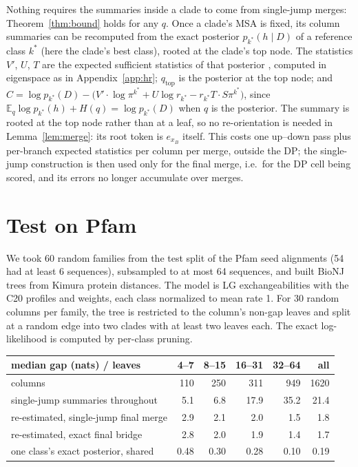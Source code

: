 \documentclass[11pt]{article}
\newcommand{\E}{\mathbb E}
\begin{document}
Nothing requires the summaries inside a clade to come from single-jump merges:
Theorem~\ref{thm:bound} holds for any $q$. Once a clade's MSA is fixed, its
column summaries can be recomputed from the exact posterior $p_{k^*}(h\mid D)$
of a reference class $k^*$ (here the clade's best class), rooted at the clade's
top node. The statistics $V'$, $U$, $T$ are the expected sufficient statistics
of that posterior \citep{HolmesRubin2002,HobolthJensen2005}, computed in
eigenspace as in Appendix~\ref{app:hr}; $q_{\mathrm{top}}$
is the posterior at the top node; and $C=\log p_{k^*}(D)-\big(V'\cdot\log
\pi^{k^*}+U\log r_{k^*}-r_{k^*}T\cdot S\pi^{k^*}\big)$, since
$\E_q\log p_{k^*}(h)+H(q)=\log p_{k^*}(D)$ when $q$ is the posterior. The
summary is rooted at the top node rather than at a leaf, so no re-orientation
is needed in Lemma~\ref{lem:merge}: its root token is $e_{x_B}$ itself. This
costs one up--down pass plus per-branch expected statistics per column per
merge, outside the DP; the single-jump construction is then used only for the
final merge, i.e.\ for the DP cell being scored, and its errors no longer
accumulate over merges.

\section{Test on Pfam}
\label{sec:pfam}

We took 60 random families from the
test split of the Pfam seed alignments (54 had at least 6 sequences),
subsampled to at most 64 sequences, and built BioNJ trees \citep{Gascuel1997}
from Kimura protein
distances. The model is LG exchangeabilities with the C20 profiles and
weights, each class normalized to mean rate 1. For 30 random columns per
family, the tree is restricted to the column's non-gap leaves and split at a
random edge into two clades with at least two leaves each. The exact
log-likelihood is computed by per-class pruning.

\begin{center}
\begin{tabular}{lrrrrr}
\toprule
median gap (nats) / leaves & 4--7 & 8--15 & 16--31 & 32--64 & all\\
\midrule
columns & 110 & 250 & 311 & 949 & 1620\\
single-jump summaries throughout & 5.1 & 6.8 & 17.9 & 35.2 & 21.4\\
re-estimated, single-jump final merge & 2.9 & 2.1 & 2.0 & 1.5 & 1.8\\
re-estimated, exact final bridge & 2.8 & 2.0 & 1.9 & 1.4 & 1.7\\
one class's exact posterior, shared & 0.48 & 0.30 & 0.28 & 0.10 & 0.19\\
\bottomrule
\end{tabular}
\end{center}
\end{document}
